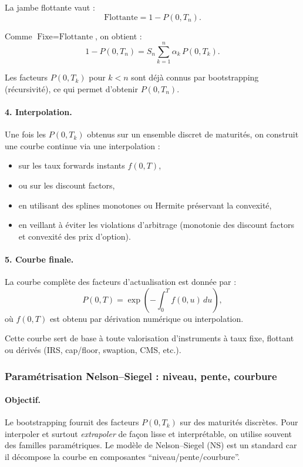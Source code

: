 \documentclass[11pt,a4paper]{article}
\newcommand{\1}{\mathbf{1}}
\begin{document}
La jambe flottante vaut :
\[
\text{Flottante} = 1 - P(0,T_n).
\]

Comme $\text{Fixe} = \text{Flottante}$, on obtient :
\[
1 - P(0,T_n)
=
S_n \sum_{k=1}^{n} \alpha_k\, P(0,T_k).
\]

Les facteurs $P(0,T_k)$ pour $k<n$ sont d\'ej\`a connus par bootstrapping
(récursivité), ce qui permet d'obtenir $P(0,T_n)$.

\paragraph{4. Interpolation.}

Une fois les $P(0,T_k)$ obtenus sur un ensemble discret de maturit\'es,
on construit une courbe continue via une interpolation :

\begin{itemize}
  \item sur les taux forwards instants $f(0,T)$,
  \item ou sur les discount factors,
  \item en utilisant des splines monotones ou Hermite préservant la convexité,
  \item en veillant à éviter les violations d'arbitrage
        (monotonie des discount factors et convexité des prix d'option).
\end{itemize}

\paragraph{5. Courbe finale.}

La courbe compl\`ete des facteurs d'actualisation est donn\'ee par :
\[
P(0,T) = \exp\!\left( -\int_0^T f(0,u)\,du \right),
\]
o\`u $f(0,T)$ est obtenu par dérivation numérique ou interpolation.

Cette courbe sert de base \`a toute valorisation d'instruments \`a taux fixe,
flottant ou dérivés (IRS, cap/floor, swaption, CMS, etc.).


\subsubsection{Param\'etrisation Nelson--Siegel : niveau, pente, courbure}

\paragraph{Objectif.}
Le bootstrapping fournit des facteurs $P(0,T_k)$ sur des maturit\'es discr\`etes. Pour interpoler et surtout \emph{extrapoler}
de fa\c{c}on lisse et interpr\'etable, on utilise souvent des familles param\'etriques. Le mod\`ele de Nelson--Siegel (NS) est un standard
car il d\'ecompose la courbe en composantes ``niveau/pente/courbure''.
\end{document}
